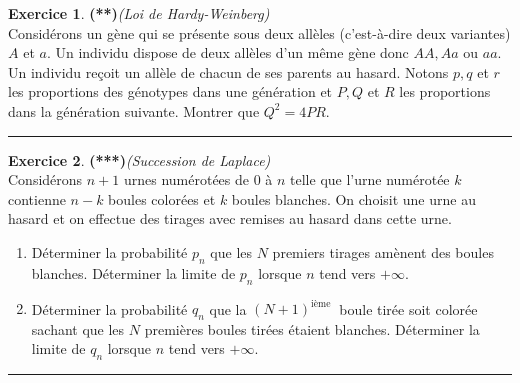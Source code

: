 \documentclass[a4paper,11pt]{article}
\theoremstyle{definition}
\newtheorem{exo}{Exercice} %
\begin{document}
\begin{minipage}{1\linewidth}\begin{minipage}[c]{0.48\linewidth}\raggedright

\begin{exo}\textbf{(**)}\quad\textit{(Loi de \sc Hardy-Weinberg)}\\[0.2cm]
	Considérons un gène qui se présente sous deux allèles (c'est-à-dire deux variantes) $A$ et $a$. Un individu dispose de deux allèles d'un même gène donc $A A, A a$ ou $a a$. Un individu reçoit un allèle de chacun de ses parents au hasard. Notons $p, q$ et $r$ les proportions des génotypes dans une génération et $P, Q$ et $R$ les proportions dans la génération suivante. Montrer que $Q^{2}=4 P R$.
	
	
	\centering\rule{1\linewidth}{0.6pt}\end{exo}



\begin{exo}\textbf{(***)}\quad\textit{(Succession de \sc Laplace)}\\[0.2cm]
	
	Considérons $n+1$ urnes numérotées de 0 à $n$ telle que l'urne numérotée $k$ contienne $n-k$ boules colorées et $k$ boules blanches. On choisit une urne au hasard et on effectue des tirages avec remises au hasard dans cette urne.
	
	\begin{enumerate}
		\item Déterminer la probabilité $p_{n}$ que les $N$ premiers tirages amènent des boules blanches. Déterminer la limite de $p_{n}$ lorsque $n$ tend vers $+\infty$.
		
		\item Déterminer la probabilité $q_{n}$ que la $(N+1)^{\text {ième }}$ boule tirée soit colorée sachant que les $N$ premières boules tirées étaient blanches. Déterminer la limite de $q_{n}$ lorsque $n$ tend vers $+\infty$.
		
	\end{enumerate}
	
	\centering\rule{1\linewidth}{0.6pt}\end{exo}




\end{minipage}\hfill\vrule\hfill\begin{minipage}[c]{0.48\linewidth}\raggedright


\end{minipage}
\end{minipage}
\end{document}
